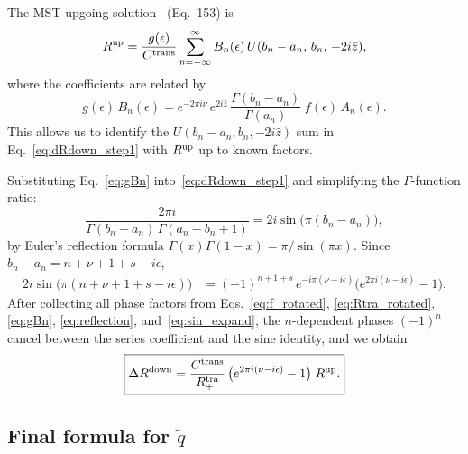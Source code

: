 \documentclass[12pt,a4paper]{article}
\begin{document}
The MST upgoing solution~\cite{SasakiTagoshi2003} (Eq.~153) is
\begin{equation}
  R^{\rm up}
  = \frac{g(\epsilon)}{C^{\mathrm{trans}}}
    \sum_{n=-\infty}^\infty B_n(\epsilon)\,
    U(b_n-a_n,\,b_n,\,-2i\hat{z}),
  \label{eq:Rup_MST}
\end{equation}
where the coefficients are related by
\begin{equation}
  g(\epsilon)\,B_n(\epsilon)
  = e^{-2\pi i\nu}\,e^{2i\hat{z}}\,
    \frac{\Gamma(b_n-a_n)}{\Gamma(a_n)}\;f(\epsilon)\,A_n(\epsilon).
  \label{eq:gBn}
\end{equation}
This allows us to identify the $U(b_n-a_n,b_n,-2i\hat{z})$ sum
in Eq.~\eqref{eq:dRdown_step1} with $R^{\rm up}$ up to known
factors.

Substituting Eq.~\eqref{eq:gBn} into~\eqref{eq:dRdown_step1}
and simplifying the $\Gamma$-function ratio:
\begin{equation}
  \frac{2\pi i}{\Gamma(b_n-a_n)\,\Gamma(a_n-b_n+1)}
  = 2i\sin\!\bigl(\pi(b_n-a_n)\bigr),
  \label{eq:reflection}
\end{equation}
by Euler's reflection formula $\Gamma(x)\Gamma(1-x)=\pi/\sin(\pi x)$.
Since $b_n - a_n = n + \nu + 1 + s - i\epsilon$,
\begin{align}
  2i\sin\!\bigl(\pi(n+\nu+1+s-i\epsilon)\bigr)
  &= (-1)^{n+1+s}\,e^{-i\pi(\nu-i\epsilon)}
     \bigl(e^{2\pi i(\nu-i\epsilon)} - 1\bigr).
  \label{eq:sin_expand}
\end{align}
After collecting all phase factors from Eqs.~\eqref{eq:f_rotated},
\eqref{eq:Rtra_rotated}, \eqref{eq:gBn}, \eqref{eq:reflection},
and~\eqref{eq:sin_expand}, the $n$-dependent phases
$(-1)^n$ cancel between the series coefficient and the sine
identity, and we obtain
\begin{equation}
  \boxed{
    \Delta R^{\rm down}
    = \frac{C^{\mathrm{trans}}}{R^{\mathrm{tra}}_+}\,
      \bigl(e^{2\pi i(\nu - i\epsilon)} - 1\bigr)\;R^{\rm up}.
  }
  \label{eq:dRdown_result}
\end{equation}

\subsection{Final formula for \texorpdfstring{$\tilde{q}$}{qtilde}}
\end{document}
